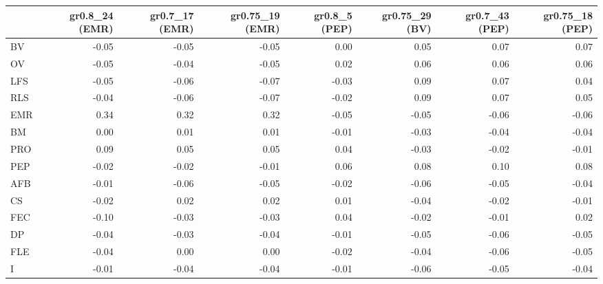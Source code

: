 \begin{landscape}
\begin{table}
\begin{footnotesize}
\begin{tabular}{@{}l|rrrrrrr@{}}
\toprule
  & gr0.8\_24 (EMR) & gr0.7\_17 (EMR) & gr0.75\_19 (EMR) & gr0.8\_5 (PEP) & gr0.75\_29 (BV) & gr0.7\_43 (PEP) & gr0.75\_18 (PEP)\\
\midrule
BV & -0.05 & -0.05 & -0.05 & 0.00 & 0.05 & 0.07 & 0.07\\
OV & -0.05 & -0.04 & -0.05 & 0.02 & 0.06 & 0.06 & 0.06\\
LFS & -0.05 & -0.06 & -0.07 & -0.03 & 0.09 & 0.07 & 0.04\\
RLS & -0.04 & -0.06 & -0.07 & -0.02 & 0.09 & 0.07 & 0.05\\
EMR & 0.34 & 0.32 & 0.32 & -0.05 & -0.05 & -0.06 & -0.06\\
BM & 0.00 & 0.01 & 0.01 & -0.01 & -0.03 & -0.04 & -0.04\\
PRO & 0.09 & 0.05 & 0.05 & 0.04 & -0.03 & -0.02 & -0.01\\
PEP & -0.02 & -0.02 & -0.01 & 0.06 & 0.08 & 0.10 & 0.08\\
AFB & -0.01 & -0.06 & -0.05 & -0.02 & -0.06 & -0.05 & -0.04\\
CS & -0.02 & 0.02 & 0.02 & 0.01 & -0.04 & -0.02 & -0.01\\
FEC & -0.10 & -0.03 & -0.03 & 0.04 & -0.02 & -0.01 & 0.02\\
DP & -0.04 & -0.03 & -0.04 & -0.01 & -0.05 & -0.06 & -0.05\\
FLE & -0.04 & 0.00 & 0.00 & -0.02 & -0.04 & -0.06 & -0.05\\
I & -0.01 & -0.04 & -0.04 & -0.01 & -0.06 & -0.05 & -0.04\\
\bottomrule
\end{tabular}

\end{footnotesize}
\end{table}
\end{landscape}%



